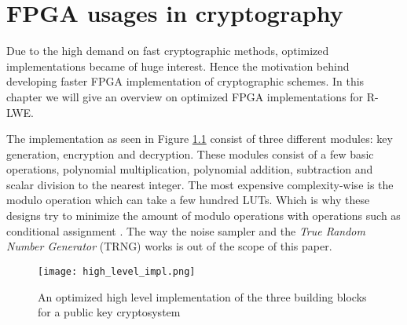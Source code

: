 \chapter{FPGA usages in cryptography\label{FPGA_crypto}}
Due to the high demand on fast cryptographic methods, optimized implementations
became of huge interest. Hence the motivation behind developing faster FPGA
implementation of cryptographic schemes. In this chapter we will give an
overview on optimized FPGA implementations for R-LWE.

The implementation as seen in Figure \ref{fig:high_level_pkc_impl} consist of
three different modules: key generation, encryption and decryption. These
modules consist of a few basic operations, polynomial multiplication,
polynomial addition, subtraction and scalar division to the nearest integer.
The most expensive complexity-wise is the modulo operation which can take a few
hundred LUTs. Which is why these designs try to minimize the amount of modulo
operations with operations such as conditional assignment
\citep{FPGA_Post_Quantum_Primitives}. The way the noise sampler and the
\textit{True
Random Number Generator} (TRNG) works is out of the scope of this paper.


\begin{figure}[H]
    \centering
    \texttt{[image: high\_level\_impl.png]}
    \caption{An optimized high level implementation of the three building
    blocks for a public key cryptosystem \citep{FPGA_Post_Quantum_Primitives}}
    \label{fig:high_level_pkc_impl}

\end{figure}

